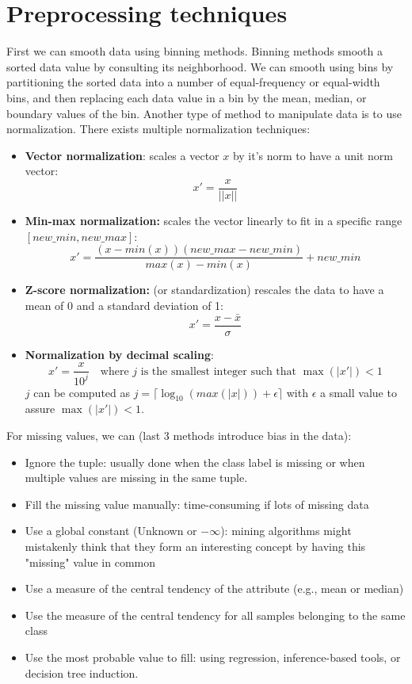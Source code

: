 \documentclass[12pt, openany]{report}
\theoremstyle{definition}
\begin{document}
\section{Preprocessing techniques}
First we can smooth data using binning methods. Binning methods smooth a sorted data value by consulting its neighborhood. We can smooth using bins by partitioning the sorted data into a number of equal-frequency or equal-width bins, and then replacing each data value in a bin by the mean, median, or boundary values of the bin. Another type of method to manipulate data is to use normalization. There exists multiple normalization techniques:
\begin{itemize}
    \item \textbf{Vector normalization}: scales a vector $x$ by it's norm to have a unit norm vector:
    \begin{equation}
        x' = \frac{x}{||x||}
    \end{equation}
    \item \textbf{Min-max normalization:} scales the vector linearly to fit in a specific range $[new\_min, new\_max]$:
    \begin{equation}
        x' = \frac{(x - min(x))(new\_max - new\_min)}{max(x) - min(x)} + new\_min 
    \end{equation}
    \item \textbf{Z-score normalization:} (or standardization) rescales the data to have a mean of 0 and a standard deviation of 1:
    \begin{equation}
        x' = \frac{x - \bar{x}}{\sigma}
    \end{equation}
    \item \textbf{Normalization by decimal scaling}:
    \begin{equation}
        x' = \frac{x}{10^j} \quad \text{where } j \text{ is the smallest integer such that } \max(|x'|) < 1
    \end{equation}
    $j$ can be computed as $j = \lceil \log_{10}(max(|x|)) + \epsilon \rceil$ with $\epsilon$ a small value to assure $\max(|x'|) < 1$.
\end{itemize}
For missing values, we can (last 3 methods introduce bias in the data): 
\begin{itemize}
    \item Ignore the tuple: usually done when the class label is missing or when multiple values are missing in the same tuple.
    \item Fill the missing value manually: time-consuming if lots of missing data
    \item Use a global constant (Unknown or $-\infty$): mining algorithms might mistakenly think that they form an interesting concept by having this "missing" value in common
    \item Use a measure of the central tendency of the attribute (e.g., mean or median)
    \item Use the measure of the central tendency for all samples belonging to the same class
    \item Use the most probable value to fill: using regression, inference-based tools, or decision tree induction.
\end{itemize}
\end{document}
